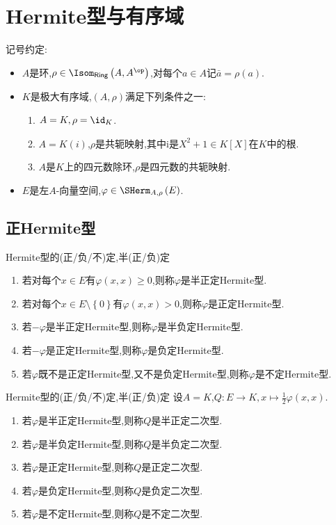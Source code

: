 \chapter{Hermite型与有序域}

记号约定:
\begin{itemize}
	\item $A$是环,$\rho\in\Isom_{\mathsf{Ring}}\left(A,A^{\op}\right)$,对每个$a\in A$记$\bar{a}=\rho\left(a\right)$.
	\item $K$是极大有序域,$\left(A,\rho\right)$满足下列条件之一:
	\begin{enumerate}
		\item $A=K,\rho=\id_{K}$.
		\item $A=K(i)$,$\rho$是共轭映射,其中$\mathrm{i}$是$X^{2}+1\in K[X]$在$K$中的根.
		\item $A$是$K$上的四元数除环,$\rho$是四元数的共轭映射.
	\end{enumerate}
	\item $E$是左$A$-向量空间,$\varphi\in\SHerm_{A,\rho}\left(E\right)$.
\end{itemize}

\section{正Hermite型}

\begin{definition}{Hermite型的(正/负/不)定,半(正/负)定}{}
	\begin{enumerate}
		\item 若对每个$x\in E$有$\varphi\left(x,x\right)\geq 0$,则称$\varphi$是半正定Hermite型.
		\item 若对每个$x\in E\setminus\left\{0\right\}$有$\varphi\left(x,x\right)>0$,则称$\varphi$是正定Hermite型.
		\item 若$-\varphi$是半正定Hermite型,则称$\varphi$是半负定Hermite型.
		\item 若$-\varphi$是正定Hermite型,则称$\varphi$是负定Hermite型.
		\item 若$\varphi$既不是正定Hermite型,又不是负定Hermite型,则称$\varphi$是不定Hermite型.
	\end{enumerate}
\end{definition}

\begin{definition}{Hermite型的(正/负/不)定,半(正/负)定}{}
	设$A=K$,$Q:E\to K,x\mapsto\frac{1}{2}\varphi\left(x,x\right)$.
	\begin{enumerate}
		\item 若$\varphi$是半正定Hermite型,则称$Q$是半正定二次型.
		\item 若$\varphi$是半负定Hermite型,则称$Q$是半负定二次型.
		\item 若$\varphi$是正定Hermite型,则称$Q$是正定二次型.
		\item 若$\varphi$是负定Hermite型,则称$Q$是负定二次型.
		\item 若$\varphi$是不定Hermite型,则称$Q$是不定二次型.
	\end{enumerate}
\end{definition}

